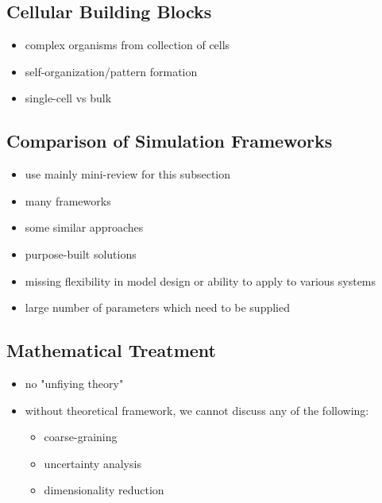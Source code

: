 \subsection{Cellular Building Blocks}
\begin{itemize}
    \item complex organisms from collection of cells
    \item self-organization/pattern formation
    \item single-cell vs bulk
\end{itemize}

\subsection{Comparison of Simulation Frameworks}
\begin{itemize}
    \item use mainly mini-review for this subsection \cite{Pleyer2023}
    \item many frameworks
    \item some similar approaches
    \item purpose-built solutions
    \item missing flexibility in model design or ability to apply to various systems
    \item large number of parameters which need to be supplied
\end{itemize}

\subsection{Mathematical Treatment}
\begin{itemize}
    \item no "unfiying theory"
    \item without theoretical framework, we cannot discuss any of the following:
    \begin{itemize}
        \item coarse-graining
        \item uncertainty analysis
        \item dimensionality reduction
    \end{itemize}
\end{itemize}

